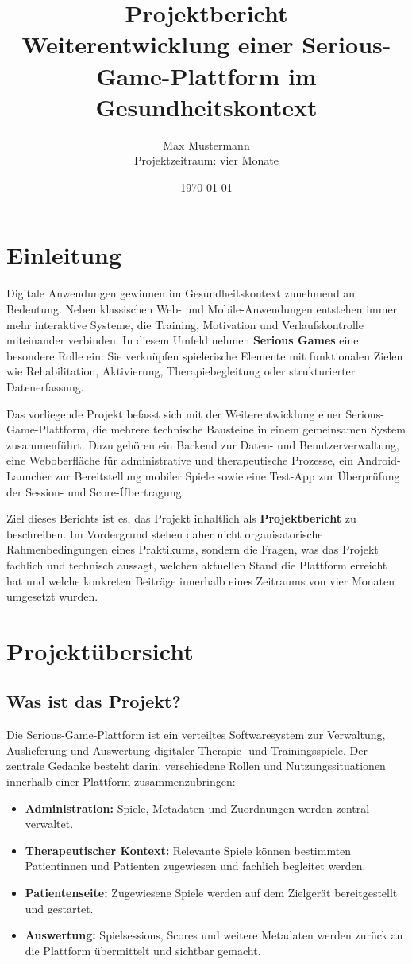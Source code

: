 \documentclass[12pt,a4paper]{article}
\title{Projektbericht\\[0.4em]\large Weiterentwicklung einer Serious-Game-Plattform im Gesundheitskontext}
\author{Max Mustermann\\Projektzeitraum: vier Monate}
\date{\today}
\begin{document}
\maketitle
\thispagestyle{empty}
\newpage

\tableofcontents
\newpage

\section{Einleitung}
Digitale Anwendungen gewinnen im Gesundheitskontext zunehmend an Bedeutung. Neben klassischen Web- und Mobile-Anwendungen entstehen immer mehr interaktive Systeme, die Training, Motivation und Verlaufskontrolle miteinander verbinden. In diesem Umfeld nehmen \textbf{Serious Games} eine besondere Rolle ein: Sie verknüpfen spielerische Elemente mit funktionalen Zielen wie Rehabilitation, Aktivierung, Therapiebegleitung oder strukturierter Datenerfassung.

Das vorliegende Projekt befasst sich mit der Weiterentwicklung einer Serious-Game-Plattform, die mehrere technische Bausteine in einem gemeinsamen System zusammenführt. Dazu gehören ein Backend zur Daten- und Benutzerverwaltung, eine Weboberfläche für administrative und therapeutische Prozesse, ein Android-Launcher zur Bereitstellung mobiler Spiele sowie eine Test-App zur Überprüfung der Session- und Score-Übertragung.

Ziel dieses Berichts ist es, das Projekt inhaltlich als \textbf{Projektbericht} zu beschreiben. Im Vordergrund stehen daher nicht organisatorische Rahmenbedingungen eines Praktikums, sondern die Fragen, was das Projekt fachlich und technisch aussagt, welchen aktuellen Stand die Plattform erreicht hat und welche konkreten Beiträge innerhalb eines Zeitraums von vier Monaten umgesetzt wurden.

\section{Projektübersicht}
\subsection{Was ist das Projekt?}
Die Serious-Game-Plattform ist ein verteiltes Softwaresystem zur Verwaltung, Auslieferung und Auswertung digitaler Therapie- und Trainingsspiele. Der zentrale Gedanke besteht darin, verschiedene Rollen und Nutzungssituationen innerhalb einer Plattform zusammenzubringen:

\begin{itemize}[leftmargin=1.5em]
  \item \textbf{Administration:} Spiele, Metadaten und Zuordnungen werden zentral verwaltet.
  \item \textbf{Therapeutischer Kontext:} Relevante Spiele können bestimmten Patientinnen und Patienten zugewiesen und fachlich begleitet werden.
  \item \textbf{Patientenseite:} Zugewiesene Spiele werden auf dem Zielgerät bereitgestellt und gestartet.
  \item \textbf{Auswertung:} Spielsessions, Scores und weitere Metadaten werden zurück an die Plattform übermittelt und sichtbar gemacht.
\end{itemize}
\end{document}
